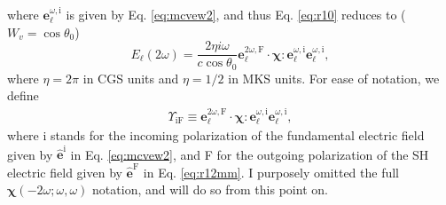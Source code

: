 where $\mathbf{e}^{\omega,\mathrm{i}}_{\ell}$ is given by Eq. \eqref{eq:mcvew2},
and thus Eq. \eqref{eq:r10} reduces to ($W_{v}=\cos\theta_{0}$)
\begin{equation}\label{eq:mr10}
E_{\ell}(2\omega) 
= \frac{2\eta i \omega}{c\cos\theta_{0}}
\mathbf{e}^{2\omega,\mathrm{F}}_{\ell}\cdot
\boldsymbol{\chi}:\mathbf{e}^{\omega,\mathrm{i}}_{\ell}
                  \mathbf{e}^{\omega,\mathrm{i}}_{\ell},
\end{equation}
where $\eta=2\pi$ in CGS units and $\eta=1/2$ in MKS units. For ease of
notation, we define
\begin{align}\label{eq:mc0}
\Upsilon_{\mathrm{iF}}
\equiv 
\mathbf{e}^{2\omega,\mathrm{F}}_{\ell}\cdot
\boldsymbol{\chi}:\mathbf{e}^{\omega,\mathrm{i}}_{\ell}
                  \mathbf{e}^{\omega,\mathrm{i}}_{\ell},
\end{align}
where i stands for the incoming polarization of the fundamental electric field
given by $\hat{\mathbf{e}}^{\mathrm{i}}$ in Eq. \eqref{eq:mcvew2}, and F for the
outgoing polarization of the SH electric field given by
$\hat{\mathbf{e}}^{\mathrm{F}}$ in Eq. \eqref{eq:r12mm}. I purposely omitted the
full $\boldsymbol{\chi}(-2\omega;\omega,\omega)$ notation, and will do so from
this point on.

